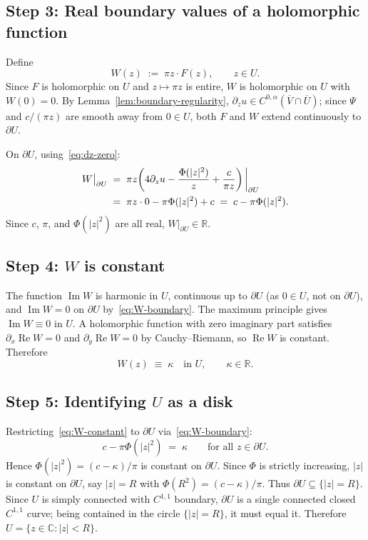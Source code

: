 \documentclass[11pt]{article}
\newcommand{\C}{\mathbb{C}}
\newcommand{\R}{\mathbb{R}}
\newcommand{\1}{\mathbf{1}}
\renewcommand{\Im}{\operatorname{Im}}
\renewcommand{\Re}{\operatorname{Re}}
\begin{document}
\subsection*{Step 3: Real boundary values of a holomorphic function}

Define
\begin{equation}\label{eq:W}
  W(z) \;:=\; \pi z \cdot F(z), \qquad z\in U.
\end{equation}
Since $F$ is holomorphic on $U$ and $z\mapsto\pi z$ is entire, $W$ is holomorphic on $U$ with
$W(0)=0$.  By Lemma~\ref{lem:boundary-regularity}, $\partial_z u\in C^{0,\alpha}(\overline V
\cap\overline U)$; since $\Psi$ and $c/(\pi z)$ are smooth away from $0\in U$, both $F$ and
$W$ extend continuously to $\partial U$.

On $\partial U$, using~\eqref{eq:dz-zero}:
\begin{align}
  W\big|_{\partial U}
  &\;=\;
  \pi z\!\left(4\partial_z u - \frac{\Phi(|z|^2)}{z}+\frac{c}{\pi z}\right)\bigg|_{\partial U}
  \notag\\
  &\;=\;
  \pi z\cdot 0 - \pi\Phi(|z|^2) + c
  \;=\;
  c - \pi\Phi(|z|^2).
  \label{eq:W-boundary}
\end{align}
Since $c$, $\pi$, and $\Phi(|z|^2)$ are all real, $W\big|_{\partial U}\in\R$.

\subsection*{Step 4: $W$ is constant}

The function $\Im W$ is harmonic in $U$, continuous up to $\partial U$ (as $0\in U$, not on
$\partial U$), and $\Im W=0$ on $\partial U$ by~\eqref{eq:W-boundary}.  The maximum principle
gives $\Im W\equiv 0$ in $U$.  A holomorphic function with zero imaginary part satisfies
$\partial_x\Re W=0$ and $\partial_y\Re W=0$ by Cauchy--Riemann, so $\Re W$ is constant.
Therefore
\begin{equation}\label{eq:W-constant}
  W(z) \;\equiv\; \kappa \quad\text{in }U, \qquad \kappa\in\R.
\end{equation}

\subsection*{Step 5: Identifying $U$ as a disk}

Restricting~\eqref{eq:W-constant} to $\partial U$ via~\eqref{eq:W-boundary}:
\[
  c - \pi\Phi(|z|^2) \;=\; \kappa \qquad \text{for all }z\in\partial U.
\]
Hence $\Phi(|z|^2)=(c-\kappa)/\pi$ is constant on $\partial U$.  Since $\Phi$ is strictly
increasing, $|z|$ is constant on $\partial U$, say $|z|=R$ with $\Phi(R^2)=(c-\kappa)/\pi$.
Thus $\partial U\subseteq\{|z|=R\}$.  Since $U$ is simply connected with $C^{1,1}$ boundary,
$\partial U$ is a single connected closed $C^{1,1}$ curve; being contained in the circle
$\{|z|=R\}$, it must equal it.  Therefore $U=\{z\in\C:|z|<R\}$.
\end{document}

